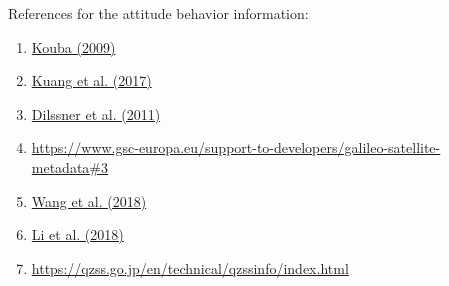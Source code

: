 References for the attitude behavior information:
\begin{enumerate}
\item \href{https://doi.org/10.1007/s10291-008-0092-1}{Kouba (2009)}
\item \href{https://doi.org/10.1007/s10291-016-0562-9}{Kuang et al. (2017)}
\item \href{https://doi.org/10.1016/j.asr.2010.09.007}{Dilssner et al. (2011)}
\item \url{https://www.gsc-europa.eu/support-to-developers/galileo-satellite-metadata#3}
\item \href{https://doi.org/10.1007/s10291-018-0783-1}{Wang et al. (2018)}
\item \href{https://doi.org/10.1017/S0373463318000103}{Li et al. (2018)}
\item \url{https://qzss.go.jp/en/technical/qzssinfo/index.html}
\end{enumerate}


